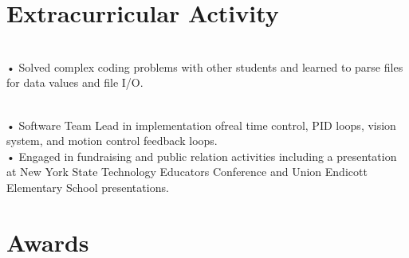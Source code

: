 \documentclass[]{deedy-resume-openfont}
\begin{document}
\section{Extracurricular Activity}
\raggedright

\\
• Solved complex coding problems with other students and learned to parse files for data values and file I/O.\\
\sectionsep
  

\\
• Software Team Lead in implementation ofreal time control, PID loops, vision system, and motion control feedback loops. \\
• Engaged in fundraising and public relation activities including a presentation at New York State Technology Educators Conference and Union Endicott Elementary School presentations.\\
\sectionsep
%
%
\section{Awards}
  \\

\sectionsep
{}  \\

\sectionsep
\ 
\end{document}

